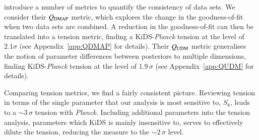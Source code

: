 \citet{Raveri2019} introduce a number of metrics to quantify the consistency of data sets.   We consider their $Q_{\rm DMAP}$ metric, which explores the change in the goodness-of-fit when two data sets are combined.   A reduction in the goodness-of-fit can then be translated into a tension metric, finding a KiDS-{\it Planck} tension at the level of $2.1\sigma$ (see Appendix~\ref{app:QDMAP} for details).    
Their $Q_{\rm UDM}$ metric generalises the notion of parameter differences between posteriors to multiple dimensions, finding KiDS-{\it Planck} tension at the level of $1.9\,\sigma$ (see Appendix~\ref{app:QUDM} for details).   

Comparing tension metrics, we find a fairly consistent picture.  Reviewing tension in terms of the single parameter that our \tttp analysis is most sensitive to, $S_8$, leads to a $\sim\! 3\,\sigma$ tension with {\it Planck}.   
Including additional parameters into the tension analysis, parameters which KiDS is mainly insensitive to, serves to effectively dilute the tension, reducing the measure to the $\sim\! 2\,\sigma$ level.    













